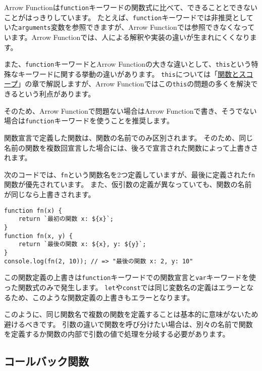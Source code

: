 Arrow
Functionは\texttt{function}キーワードの関数式に比べて、できることとできないことがはっきりしています。
たとえば、\texttt{function}キーワードでは非推奨としていた\texttt{arguments}変数を参照できますが、Arrow
Functionでは参照できなくなっています。Arrow
Functionでは、人による解釈や実装の違いが生まれにくくなります。

また、\texttt{function}キーワードとArrow
Functionの大きな違いとして、\texttt{this}という特殊なキーワードに関する挙動の違いがあります。
\texttt{this}については「\hyperlink{function-and-scope}{関数とスコープ}」の章で解説しますが、Arrow
Functionではこの\texttt{this}の問題の多くを解決できるという利点があります。

そのため、Arrow Functionで問題ない場合はArrow
Functionで書き、そうでない場合は\texttt{function}キーワードを使うことを推奨します。

\begin{tcolorbox}[title=同じ名前の関数宣言は上書きされる]\label{function-overwrite}

関数宣言で定義した関数は、関数の名前でのみ区別されます。
そのため、同じ名前の関数を複数回宣言した場合には、後ろで宣言された関数によって上書きされます。

次のコードでは、\texttt{fn}という関数名を2つ定義していますが、最後に定義された\texttt{fn}関数が優先されています。
また、仮引数の定義が異なっていても、関数の名前が同じなら上書きされます。

\begin{lstlisting}
function fn(x) {
    return `最初の関数 x: ${x}`;
}
function fn(x, y) {
    return `最後の関数 x: ${x}, y: ${y}`;
}
console.log(fn(2, 10)); // => "最後の関数 x: 2, y: 10"
\end{lstlisting}

この関数定義の上書きは\texttt{function}キーワードでの関数宣言と\texttt{var}キーワードを使った関数式のみで発生します。
\texttt{let}や\texttt{const}では同じ変数名の定義はエラーとなるため、このような関数定義の上書きもエラーとなります。

このように、同じ関数名で複数の関数を定義することは基本的に意味がないため避けるべきです。
引数の違いで関数を呼び分けたい場合は、別々の名前で関数を定義するか関数の内部で引数の値で処理を分岐する必要があります。
\end{tcolorbox}

\hypertarget{callback}{%
\subsection{コールバック関数}\label{callback}}


